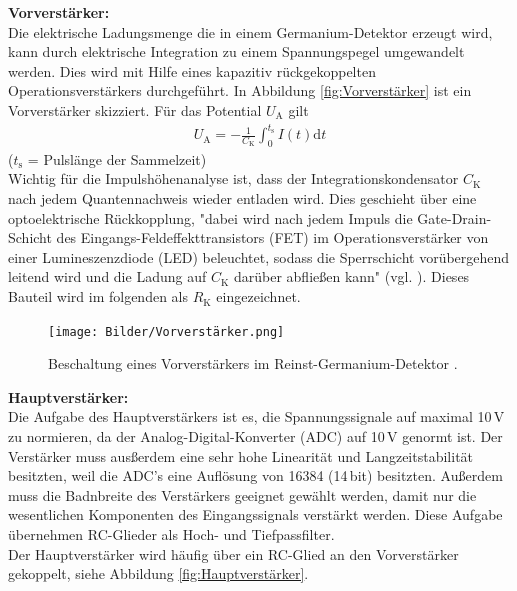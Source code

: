 \textbf{Vorverstärker:} \\
Die elektrische Ladungsmenge die in einem Germanium-Detektor erzeugt wird, kann durch elektrische Integration zu einem Spannungspegel umgewandelt werden. Dies wird mit Hilfe eines kapazitiv rückgekoppelten Operationsverstärkers durchgeführt. In Abbildung \eqref{fig:Vorverstärker} ist ein Vorverstärker skizziert. Für das Potential $U_\text{A}$ gilt
\begin{align}
  U_\text{A} = - \frac{1}{C_\text{K}} \int_{0}^{t_\text{s}} I(t) \text{d}t
\end{align}
\hfil {\footnotesize($t_\text{s}$ = Pulslänge der Sammelzeit)} \hfil \\

Wichtig für die Impulshöhenanalyse ist, dass der Integrationskondensator $C_\text{K}$ nach jedem Quantennachweis wieder entladen wird. Dies geschieht über eine optoelektrische Rückkopplung, "dabei wird nach jedem Impuls die Gate-Drain-Schicht des Eingangs-Feldeffekttransistors (FET) im Operationsverstärker von einer Lumineszenzdiode (LED) beleuchtet, sodass die Sperrschicht vorübergehend leitend wird und die Ladung auf $C_\text{K}$ darüber abfließen kann" (vgl. \cite[18]{V18}). Dieses Bauteil wird im folgenden als $R_\text{K}$ eingezeichnet.

\begin{figure}[H]
  \centering
  \texttt{[image: Bilder/Vorverstärker.png]}
  \caption{Beschaltung eines Vorverstärkers im Reinst-Germanium-Detektor \cite{V18}.}
  \label{fig:Vorverstärker}
\end{figure}

\textbf{Hauptverstärker:} \\
Die Aufgabe des Hauptverstärkers ist es, die Spannungssignale auf maximal 10\,V zu normieren, da der Analog-Digital-Konverter (ADC) auf 10\,V genormt ist. Der Verstärker muss ausßerdem eine sehr hohe Linearität und Langzeitstabilität besitzten, weil die ADC's eine Auflösung von 16384 (14\,bit) besitzten. Außerdem muss die Badnbreite des Verstärkers geeignet gewählt werden, damit nur die wesentlichen Komponenten des Eingangssignals verstärkt werden. Diese Aufgabe übernehmen RC-Glieder als Hoch- und Tiefpassfilter. \\
Der Hauptverstärker wird häufig über ein RC-Glied an den Vorverstärker gekoppelt, siehe Abbildung \eqref{fig:Hauptverstärker}.

